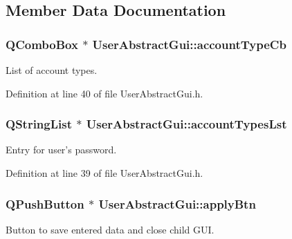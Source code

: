 \subsection{Member Data Documentation}
\hypertarget{class_user_abstract_gui_ae4e3c37c68ef01e91687d7732e45d78d}{
\subsubsection[{account\-Type\-Cb}]{\setlength{\rightskip}{0pt plus 5cm}Q\-Combo\-Box $\ast$ User\-Abstract\-Gui\-::account\-Type\-Cb\hspace{0.3cm}{\ttfamily [private]}}}\label{class_user_abstract_gui_ae4e3c37c68ef01e91687d7732e45d78d}
List of account types. 

Definition at line 40 of file User\-Abstract\-Gui.\-h.

\hypertarget{class_user_abstract_gui_ab9b3708ae3bf7bad2bc5028f771d8649}{
\subsubsection[{account\-Types\-Lst}]{\setlength{\rightskip}{0pt plus 5cm}Q\-String\-List $\ast$ User\-Abstract\-Gui\-::account\-Types\-Lst\hspace{0.3cm}{\ttfamily [private]}}}\label{class_user_abstract_gui_ab9b3708ae3bf7bad2bc5028f771d8649}
Entry for user's password. 

Definition at line 39 of file User\-Abstract\-Gui.\-h.

\hypertarget{class_user_abstract_gui_a84e6aafe45debec2b57447a5ea60a241}{
\subsubsection[{apply\-Btn}]{\setlength{\rightskip}{0pt plus 5cm}Q\-Push\-Button $\ast$ User\-Abstract\-Gui\-::apply\-Btn\hspace{0.3cm}{\ttfamily [private]}}}\label{class_user_abstract_gui_a84e6aafe45debec2b57447a5ea60a241}
Button to save entered data and close child G\-U\-I. 

